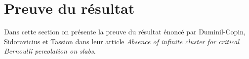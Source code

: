 \chapter{Preuve du résultat}
	Dans cette section on présente la preuve du résultat énoncé par Duminil-Copin, Sidoravicius et Tassion dans leur article \emph{Absence of infinite cluster for critical Bernoulli percolation on slabs}.
	
	
	
	
	
	
	
\Tbreak
